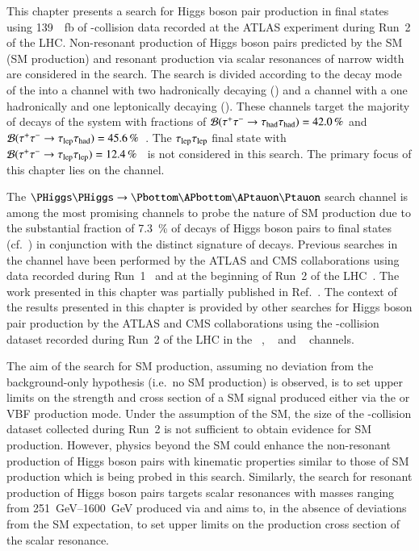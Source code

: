 This chapter presents a search for Higgs boson pair production in
\bbtautau final states using \SI{139}{\per\femto\barn} of
\pp-collision data recorded at the ATLAS experiment during Run~2 of
the LHC. Non-resonant production of Higgs boson pairs predicted by the
SM (SM \HH production) and resonant production via scalar resonances
of narrow width are considered in the search. The search is divided
according to the decay mode of the \tauleptons into a channel with two
hadronically decaying \tauleptons (\hadhad) and a channel with a one
hadronically and one leptonically decaying \taulepton (\lephad). These
channels target the majority of decays of the \tautau system with
fractions of $\mathcal{B}(\tau^{+} \tau^{-} \to \tau_{\text{had}}\tau_{\text{had}}) = \SI{42.0}{\percent}$
and
$\mathcal{B}(\tau^{+} \tau^{-} \to \tau_{\text{lep}}\tau_{\text{had}}) =
\SI{45.6}{\percent}$~\cite{Zyla:2020zbs}. The $\tau_{\text{lep}}\tau_{\text{lep}}$ final
state with
$\mathcal{B}(\tau^{+} \tau^{-} \to \tau_{\text{lep}}\tau_{\text{lep}}) =
\SI{12.4}{\percent}$~\cite{Zyla:2020zbs} is not considered in this
search. The primary focus of this chapter lies on the \hadhad channel.

The $\HH \to \bbtautau$ search channel is among the most promising
channels to probe the nature of SM \HH production due to the
substantial fraction of \SI{7.3}{\percent} of decays of Higgs boson
pairs to \bbtautau final states (cf.~)
in conjunction with the distinct signature of \taulepton
decays. Previous searches in the \bbtautau channel have been performed
by the ATLAS and CMS collaborations using data recorded during
Run~1~\cite{HIGG-2013-33,CMS-HIG-15-013} and at the beginning of Run~2
of the LHC~\cite{HIGG-2016-16-witherratum,CMS-HIG-17-002}. The work
presented in this chapter was partially published in
Ref.~\cite{ATLAS-CONF-2021-052}. The context of the results presented
in this chapter is provided by other searches for Higgs boson pair
production by the ATLAS and CMS collaborations using the \pp-collision
dataset recorded during Run~2 of the LHC in the
\bbtautau~\cite{CMS-PAS-HIG-20-010},
\bbbb~\cite{ATLAS-CONF-2022-035,CMS-HIG-20-005} and
\bbyy~\cite{HDBS-2018-34,CMS-HIG-19-018} channels.

The aim of the search for SM \HH production, assuming no deviation
from the background-only hypothesis (i.e.\ no SM \HH production) is
observed, is to set upper limits on the strength and cross section of
a SM \HH signal produced either via the \ggF or VBF production
mode. Under the assumption of the SM, the size of the \pp-collision
dataset collected during Run~2 is not sufficient to obtain evidence
for SM \HH production. However, physics beyond the SM could enhance
the non-resonant production of Higgs boson pairs with kinematic
properties similar to those of SM \HH production which is being probed
in this search. Similarly, the search for resonant production of Higgs
boson pairs targets scalar resonances with masses ranging from
\SIrange{251}{1600}{\GeV} produced via \ggF and aims to, in the
absence of deviations from the SM expectation, to set upper limits on
the production cross section of the scalar resonance.

